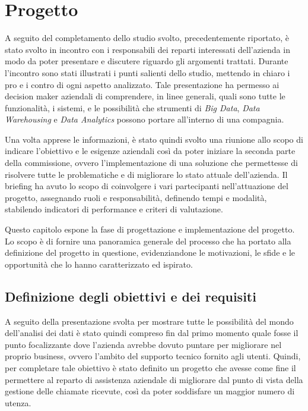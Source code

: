 \chapter{Progetto}
\label{ch:Project}

A seguito del completamento dello studio svolto, precedentemente riportato, è stato svolto in incontro con i responsabili dei reparti interessati dell'azienda in modo da poter presentare e discutere riguardo gli argomenti trattati. Durante l'incontro sono stati illustrati i punti salienti dello studio, mettendo in chiaro i pro e i contro di ogni aspetto analizzato. Tale presentazione ha permesso ai decision maker aziendali di comprendere, in linee generali, quali sono tutte le funzionalità, i sistemi, e le possibilità che strumenti di \textit{Big Data}, \textit{Data Warehousing} e \textit{Data Analytics} possono portare all'interno di una compagnia. 

Una volta apprese le informazioni, è stato quindi svolto una riunione allo scopo di indicare l'obiettivo e le esigenze aziendali così da poter iniziare la seconda parte della commissione, ovvero l'implementazione di una soluzione che permettesse di risolvere tutte le problematiche e di migliorare lo stato attuale dell'azienda. Il briefing ha avuto lo scopo di coinvolgere i vari partecipanti nell'attuazione del progetto, assegnando ruoli e responsabilità, definendo tempi e modalità, stabilendo indicatori di performance e criteri di valutazione.

Questo capitolo espone la fase di progettazione e implementazione del progetto. Lo scopo è di fornire una panoramica generale del processo che ha portato alla definizione del progetto in questione, evidenziandone le motivazioni, le sfide e le opportunità che lo hanno caratterizzato ed ispirato.

\section{Definizione degli obiettivi e dei requisiti}

A seguito della presentazione svolta per mostrare tutte le possibilità del mondo dell'analisi dei dati è stato quindi compreso fin dal primo momento quale fosse il punto focalizzante dove l'azienda avrebbe dovuto puntare per migliorare nel proprio business, ovvero l'ambito del supporto tecnico fornito agli utenti. Quindi, per completare tale obiettivo è stato definito un progetto che avesse come fine il permettere al reparto di assistenza aziendale di migliorare dal punto di vista della gestione delle chiamate ricevute, così da poter soddisfare un maggior numero di utenza.

